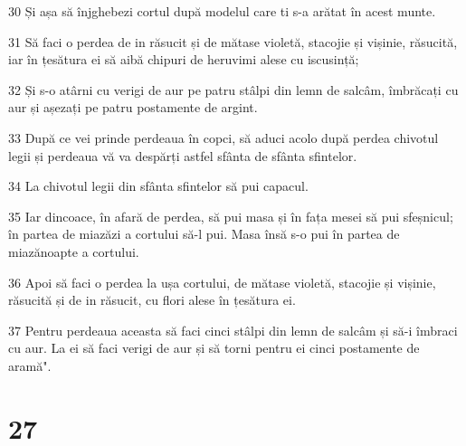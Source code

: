 \par 30 Și așa să înjghebezi cortul după modelul care ti s-a arătat în acest munte.
\par 31 Să faci o perdea de in răsucit și de mătase violetă, stacojie și vișinie, răsucită, iar în țesătura ei să aibă chipuri de heruvimi alese cu iscusință;
\par 32 Și s-o atârni cu verigi de aur pe patru stâlpi din lemn de salcâm, îmbrăcați cu aur și așezați pe patru postamente de argint.
\par 33 După ce vei prinde perdeaua în copci, să aduci acolo după perdea chivotul legii și perdeaua vă va despărți astfel sfânta de sfânta sfintelor.
\par 34 La chivotul legii din sfânta sfintelor să pui capacul.
\par 35 Iar dincoace, în afară de perdea, să pui masa și în fața mesei să pui sfeșnicul; în partea de miazăzi a cortului să-l pui. Masa însă s-o pui în partea de miazănoapte a cortului.
\par 36 Apoi să faci o perdea la ușa cortului, de mătase violetă, stacojie și vișinie, răsucită și de in răsucit, cu flori alese în țesătura ei.
\par 37 Pentru perdeaua aceasta să faci cinci stâlpi din lemn de salcâm și să-i îmbraci cu aur. La ei să faci verigi de aur și să torni pentru ei cinci postamente de aramă".

\chapter{27}

